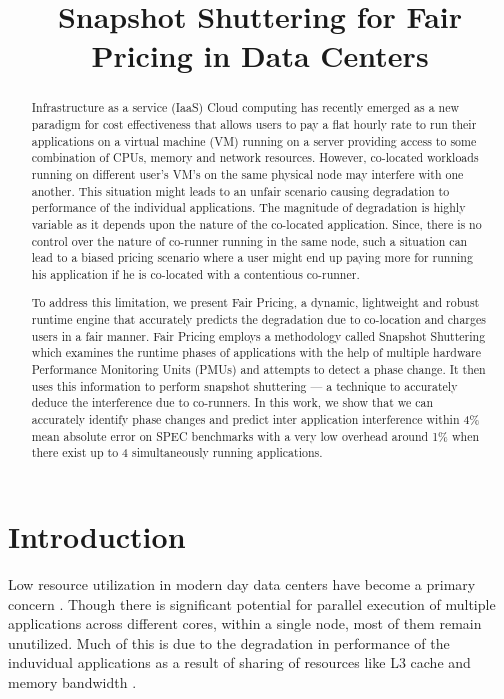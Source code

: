 \documentclass[pageno]{jpaper}
\date{}
\begin{document}
\title{Snapshot Shuttering for Fair Pricing in Data Centers}
\maketitle

\begin{abstract}

Infrastructure as a service (IaaS) Cloud computing has recently emerged as a new paradigm for cost effectiveness that allows users to pay a flat hourly rate to run their applications on a virtual machine (VM) running on a server providing access to some combination of CPUs, memory and network resources. However, co-located workloads running on different user's VM's on the same physical node may interfere with one another. This situation might leads to an unfair scenario causing degradation to performance of the individual applications.  The magnitude of degradation is highly variable as it depends upon the nature of the co-located application. Since, there is no control over the nature of co-runner running in the same node, such a situation can lead to a biased pricing scenario where a user might end up paying more for running his application if he is co-located with a contentious co-runner.

To address this limitation, we present Fair Pricing, a dynamic, lightweight and robust runtime engine that accurately predicts the degradation due to co-location and charges users in a fair manner. Fair Pricing employs a methodology called Snapshot Shuttering which examines the runtime phases of applications with the help of multiple hardware Performance Monitoring Units (PMUs) and attempts to detect a phase change. It then uses this information to perform snapshot shuttering --- a technique to accurately deduce the interference due to co-runners. In this work, we show that we can accurately identify phase changes and predict inter application interference within 4\% mean absolute error on SPEC benchmarks with a very low overhead around 1\% when there exist up to 4 simultaneously running applications.

\end{abstract}
\section{Introduction}
\label{sec:Introduction}

Low resource utilization in modern day data centers have become a primary concern \cite{Barroso:2007:CEC:1339817.1339894}. Though there is significant potential for parallel execution of multiple applications across different cores, within a single node, most of them remain unutilized. Much of this is due to the degradation in performance of the induvidual applications as a result of sharing of resources like L3 cache and memory bandwidth \cite{37124} \cite{Zhuravlev:2010:ASR:1735971.1736036} \cite{Zhuravlev:2010:ASR:1736020.1736036} \cite{Zhuravlev:2010:ASR:1735970.1736036} \cite{Govindan:2011:CQE:2038916.2038938}.
\end{document}
